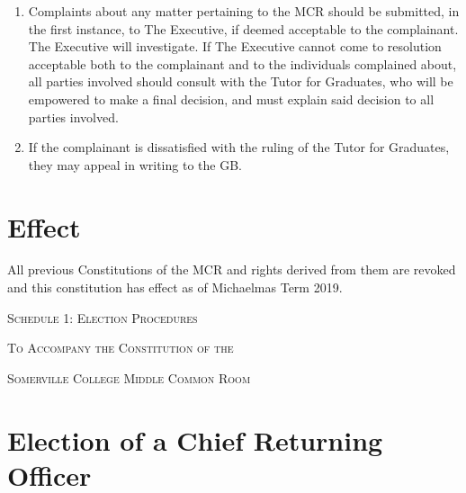 \documentclass[11pt, a4paper]{article}
\begin{document}
\begin{enumerate}
    \item Complaints about any matter pertaining to the MCR should be submitted, in the first instance, to The Executive, if deemed acceptable to the complainant. The Executive will investigate. If The Executive cannot come to resolution acceptable both to the complainant and to the individuals complained about, all parties involved should consult with the Tutor for Graduates, who will be empowered to make a final decision, and must explain said decision to all parties involved.
    \item If the complainant is dissatisfied with the ruling of the Tutor for Graduates, they may appeal in writing to the GB.
\end{enumerate}





\section{Effect}
\label{sec:effect}

All previous Constitutions of the MCR and rights derived from them are revoked and this constitution has effect as of Michaelmas Term 2019.





\clearpage
\setcounter{section}{0}





\centerline{{\Huge \textsc{Schedule 1: Election Procedures}}}
\vspace{2mm}
\centerline{{\Large \textsc{To Accompany the Constitution of the}}}
\vspace{2mm}
\centerline{{\Large \textsc{Somerville College Middle Common Room}}}





\section{Election of a Chief Returning Officer}
\label{sec:cro}
\end{document}
